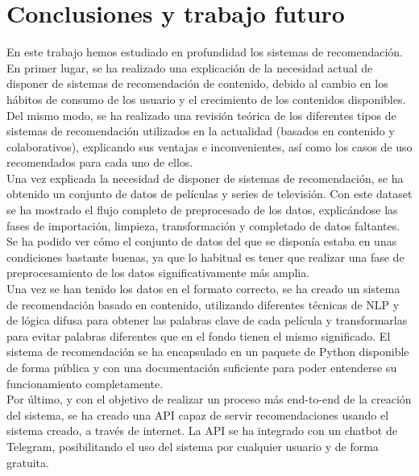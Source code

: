 \chapter{Conclusiones y trabajo futuro}\label{chap:resultados}

En este trabajo hemos estudiado en profundidad los sistemas de recomendación. En primer lugar, se ha realizado una explicación de la necesidad actual de disponer de sistemas de recomendación de contenido, debido al cambio en los hábitos de consumo de los usuario y el crecimiento de los contenidos disponibles. Del mismo modo, se ha realizado una revisión teórica de los diferentes tipos de sistemas de recomendación utilizados en la actualidad (basados en contenido y colaborativos), explicando sus ventajas e inconvenientes, así como los casos de uso recomendados para cada uno de ellos.\\

Una vez explicada la necesidad de disponer de sistemas de recomendación, se ha obtenido un conjunto de datos de películas y series de televisión. Con este dataset se ha mostrado el flujo completo de preprocesado de los datos, explicándose las fases de importación, limpieza, transformación y completado de datos faltantes. Se ha podido ver cómo el conjunto de datos del que se disponía estaba en unas condiciones bastante buenas, ya que lo habitual es tener que realizar una fase de preprocesamiento de los datos significativamente más amplia.\\

Una vez se han tenido los datos en el formato correcto, se ha creado un sistema de recomendación basado en contenido, utilizando diferentes técnicas de NLP y de lógica difusa para obtener las palabras clave de cada película y transformarlas para evitar palabras diferentes que en el fondo tienen el mismo significado. El sistema de recomendación se ha encapsulado en un paquete de Python disponible de forma pública y con una documentación suficiente para poder entenderse su funcionamiento completamente.\\

Por último, y con el objetivo de realizar un proceso más end-to-end de la creación del sistema, se ha creado una API capaz de servir recomendaciones usando el sistema creado, a través de internet. La API se ha integrado con un chatbot de Telegram, posibilitando el uso del sistema por cualquier usuario y de forma gratuita.\\


